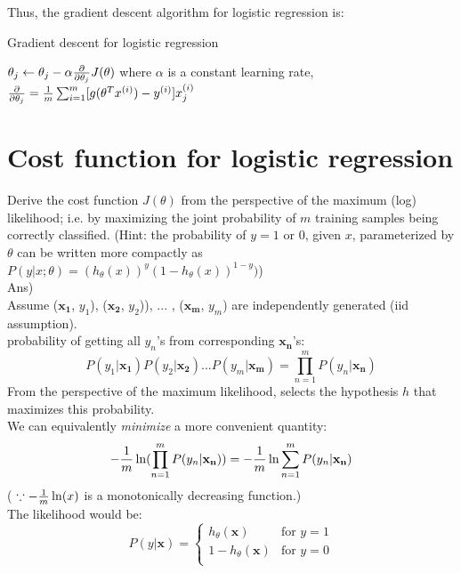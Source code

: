 \documentclass[12pt]{article}%
\begin{document}
Thus, the gradient descent algorithm for logistic regression is:\\
\begin{algorithm}
	\caption{Gradient descent for logistic regression}
	\begin{algorithmic}[1]
		\Repeat
		\State $\theta_j \leftarrow \theta_j - \alpha {\partial \over {\partial \theta_j}} J(\theta)$ 
		\State where $\alpha$ is a constant learning rate,
		${\partial \over {\partial \theta_j}} = {1 \over m} \sum_{i=1}^{m} [g(\theta^T x^{(i)}) - y^{(i)}]x_j^{(i)}$
	\end{algorithmic}
\end{algorithm}
\section{Cost function for logistic regression}
Derive the cost function $J(\theta)$ from the perspective of the maximum (log) likelihood; i.e. by maximizing the joint probability of $m$ training samples being correctly classified. (Hint: the probability of $y=1$ or $0$, given $x$, parameterized by $\theta$ can be written more compactly as $P(y | x; \theta) = (h_\theta (x))^y (1 - h_\theta (x))^{1-y} )$)\\

Ans)\\
Assume ($\mathbf{x_1}$, $y_1$), ($\mathbf{x_2}$, $y_2$)), $...$ , ($\mathbf{x_m}$, $y_m$) are independently generated (iid assumption).\\
probability of getting all $y_n$'s from corresponding $\mathbf{x_n}$'s:
\begin{equation}
	P(y_1 | \mathbf{x_1})P(y_2 | \mathbf{x_2}) ... P(y_m | \mathbf{x_m}) = \prod_{n=1}^{m} {P(y_n | \mathbf{x_n})}
\end{equation}
From the perspective of the maximum likelihood, selects the hypothesis $h$ that maximizes this probability.\\
We can equivalently \textit{minimize} a more convenient quantity: 
\begin{equation}
	- {1 \over m} \ln (\prod_{n=1}^{m} {P(y_n | \mathbf{x_n})}) = -{1 \over m} \ln \sum_{n=1}^{m} P(y_n | \mathbf{x_n})
\end{equation}
( $\because - {1 \over m} \ln(x)$ is a monotonically decreasing function.)\\
The likelihood would be:
\begin{equation}
	P(y | \mathbf{x}) = 
	\begin{cases}
		h_\theta (\mathbf{x}) & \text{for $y = 1$}\\
		1 - h_\theta (\mathbf{x}) & \text{for $y = 0$}\\
	\end{cases}
\end{equation}
\end{document}
